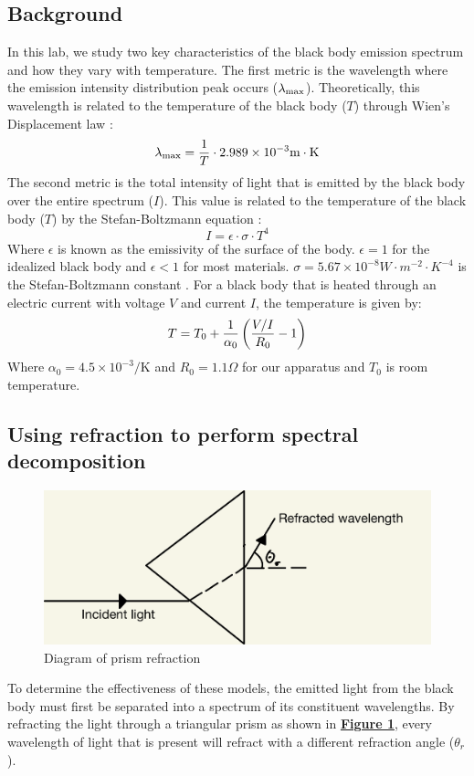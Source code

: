 \documentclass[
	letterpaper
	12pt
]{template}
\newcommand{\bref}[2]{\textbf{\hyperref[#1]{#2}}}
\begin{document}
\subsection{Background}
In this lab, we study two key characteristics of the black body emission spectrum and how they vary with temperature. The first metric is the wavelength where the emission intensity distribution peak occurs ($\lambda_{\rm max}$). Theoretically, this wavelength is related to the temperature of the black body ($T$) through Wien's Displacement law \cite{labManual}:
\begin{equation}\label{eqn::wien}
	\lambda_{\rm max} = {1\over T} \cdot 2.989\times 10^{-3}\unit{m\cdot K}
\end{equation}
The second metric is the total intensity of light that is emitted by the black body over the entire spectrum ($I$). This value is related to the temperature of the black body ($T$) by the Stefan-Boltzmann equation \cite{labManual}:
\begin{equation}\label{eqn::stefan}
	I = \epsilon \cdot \sigma \cdot T^4
\end{equation}
Where $\epsilon$ is known as the emissivity of the surface of the body. $\epsilon=1$ for the idealized black body and $\epsilon < 1$ for most materials. $\sigma = 5.67\times10^{-8}\unit{W \cdot m ^{-2} \cdot K^{-4}}$ is the Stefan-Boltzmann constant \cite{labManual}. For a black body that is heated through an electric current with voltage $V$ and current $I$, the temperature is given by: \cite{labManual}
\begin{equation}\label{eqn::temp}
	T = T_0 + {1\over \alpha_0}\left({{V/I\over R_0}-  1}\right)
\end{equation}
Where $\alpha_0=4.5\times10^{-3}\unit{\per \kelvin}$ and $R_0 = 1.1\Omega$ for our apparatus and $T_0$ is room temperature.
\subsection{Using refraction to perform spectral decomposition}\label{sec::refraction}
\begin{figure}\label{fig::refract}
	\vspace{-15pt}
	\includegraphics[width=.4\textwidth]{img/refract.png}
	\caption{Diagram of prism refraction}
	\vspace{-20pt}
\end{figure}
To determine the effectiveness of these models, the emitted light from the black body must first be separated into a spectrum of its constituent wavelengths. By refracting the light through a triangular prism as shown in \bref{fig::refract}{Figure 1}, every wavelength of light that is present will refract with a different refraction angle ($\theta_r$).\vspace{\baselineskip}
\end{document}

